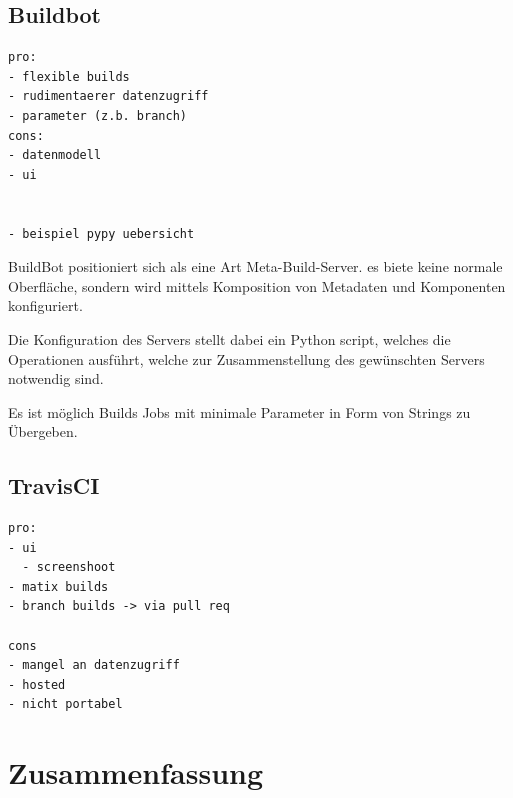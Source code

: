 \subsection{Buildbot}


\begin{verbatim}
pro:
- flexible builds
- rudimentaerer datenzugriff
- parameter (z.b. branch)
cons:
- datenmodell
- ui


- beispiel pypy uebersicht

\end{verbatim}


BuildBot positioniert sich als eine Art Meta-Build-Server.
es biete keine normale Oberfläche, sondern wird mittels
Komposition von Metadaten und Komponenten konfiguriert.

Die Konfiguration des Servers stellt dabei ein Python script,
welches die Operationen ausführt, welche zur Zusammenstellung des gewünschten Servers notwendig sind.

Es ist möglich Builds Jobs mit minimale Parameter in Form von Strings zu Übergeben.

\subsection{TravisCI}

\begin{verbatim}
pro:
- ui
  - screenshoot
- matix builds
- branch builds -> via pull req

cons
- mangel an datenzugriff
- hosted
- nicht portabel
\end{verbatim}



\section{Zusammenfassung}



